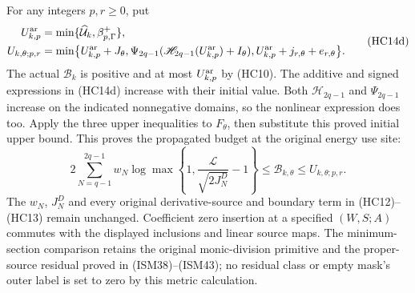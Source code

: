 For any integers $p,r\geq0$, put
\[
\begin{split}
 U_{k,p}^{\rm ar}&=\min\{\widehat{\mathcal U}_k,
                                       \beta_{p,\Gamma}^+\},\\
 U_{k,\theta;p,r}&=\min\bigl\{
 U_{k,p}^{\rm ar}+J_\theta,
 \Psi_{2q-1}(\mathscr H_{2q-1}(U_{k,p}^{\rm ar})+I_\theta),
 U_{k,p}^{\rm ar}+j_{r,\theta}+e_{r,\theta}\bigr\}.
\end{split}
\tag{HC14d}
\]
The actual $\mathcal B_k$ is positive and at most $U_{k,p}^{\rm ar}$
by (HC10). The additive and signed expressions in (HC14d) increase
with their initial value. Both $\mathscr H_{2q-1}$ and
$\Psi_{2q-1}$ increase on the indicated nonnegative domains, so
the nonlinear expression does too. Apply the three upper inequalities
to $F_\theta$, then substitute this proved initial upper bound.
This proves the propagated budget at the original energy use site:
\[
 2\sum_{N=q-1}^{2q-1}w_N
 \log\max\left\{1,\frac{\mathcal L}{\sqrt{2J_N^D}}-1\right\}
 \leq\mathcal B_{k,\theta}\leq U_{k,\theta;p,r}.
\tag{HC13a}
\]
The $w_N$, $J_N^D$ and every original derivative-source and boundary
term in (HC12)--(HC13) remain unchanged. Coefficient zero insertion
at a specified $(W,S;A)$ commutes with the displayed inclusions and
linear source maps. The minimum-section comparison retains the
original monic-division primitive and the proper-source residual
proved in (ISM38)--(ISM43); no residual class or empty mask's outer
label is set to zero by this metric calculation.
